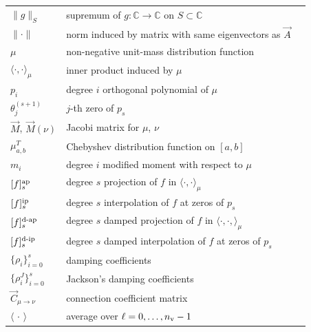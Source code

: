 \begin{center}
\begin{tabularx}{\textwidth}{p{1.9cm}Xr}
        \( \| g \|_S \) & supremum of \( g:\mathbb{C}\to\mathbb{C} \) on \( S\subset \mathbb{C} \) & \pageref{def:norm_sup} \\
        \( \| \cdot \| \) & norm induced by matrix with same eigenvectors as \( \vec{A} \) & \pageref{def:norm} \\
    \midrule
        \( \mu \) & non-negative unit-mass distribution function & \pageref{def:mu} \\
        \( \langle \cdot, \cdot \rangle_{\mu} \) & inner product induced by \( \mu \) & \pageref{eqn:mu_ip} \\
        \( p_i \) & degree \( i \) orthogonal polynomial of \( \mu \) & \pageref{def:OP}\\ 
        \( \theta_j^{(s+1)} \) & \( j \)-th zero of \( p_s \) & \pageref{thm:jacobi_eigen}\\
    \( \vec{M} \), \( \vec{M}(\nu) \) & Jacobi matrix for \( \mu \), \( \nu \) & \pageref{def:jacobi}\\
        \( \mu_{a,b}^T \) & Chebyshev distribution function on \( [a,b] \) & \pageref{def:muT}\\
        \( m_i \) & degree \( i \) modified moment with respect to \( \mu \) &\pageref{def:modified_moments}\\ 
    \midrule
        \( \ff[a]{f}{s} \) & degree \( s \) projection of \( f \) in \( \langle \cdot, \cdot \rangle_{\mu} \) & \pageref{def:fffs}\\
        \( \ff[i]{f}{s} \) & degree \( s \) interpolation of \( f \) at zeros of \( p_s \) & \pageref{def:fffs} \\
        \( \ff[d-a]{f}{s} \) & degree \( s \) damped projection of \( f \) in \( \langle \cdot, \cdot, \rangle_{\mu} \) & \pageref{def:fffs} \\
        \( \ff[d-i]{f}{s} \) & degree \( s \) damped interpolation of \( f \) at zeros of \( p_s \) & \pageref{def:fffs} \\
        \( \{ \rho_i \}_{i=0}^{s} \) & damping coefficients & \pageref{def:damping} \\
        \( \{ \rho_i^J \}_{i=0}^{s} \) & Jackson's damping coefficients & \pageref{def:jackson_coeffs} \\
    \midrule
        \( \vec{C}_{\mu\to\nu} \) & connection coefficient matrix & \pageref{def:connection_coeffs} \\
        \( \langle \,\cdot\, \rangle \) & average over \( \ell = 0, \ldots, n_{\textup{v}}-1 \) & \pageref{eqn:ave_notation} \\

\end{tabularx}
\end{center}
